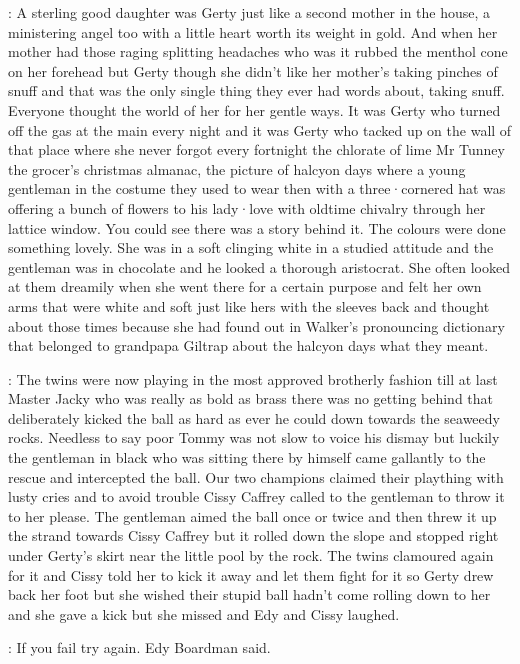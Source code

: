 :
A sterling good daughter
was Gerty
just like a second mother in the house,
a ministering angel too
with a little heart
worth its weight in gold.
And when her mother
had those raging splitting headaches
who was it rubbed the menthol cone on her forehead
but Gerty
though she didn't like her mother's taking pinches of snuff
and that was the only single thing
they ever had words about,
taking snuff.
Everyone thought the world of her
for her gentle ways.
It was Gerty
who turned off the gas at the main every night
and it was Gerty
who tacked up on the wall
of that place where she never forgot
every fortnight the chlorate of lime
Mr Tunney the grocer's christmas almanac,
the picture of halcyon days
where a young gentleman
in the costume they used to wear then
with a three·cornered hat
was offering a bunch of flowers
to his lady·love
with oldtime chivalry
through her lattice window.
You could see
there was a story behind it.
The colours were done something lovely.
She was in a soft clinging white
in a studied attitude
and the gentleman was in chocolate
and he looked a thorough aristocrat.
She often looked at them dreamily
when she went there
for a certain purpose
and felt her own arms
that were white and soft
just like hers
with the sleeves back
and thought about those times
because she had found out
in Walker's pronouncing dictionary
that belonged to grandpapa Giltrap
about the halcyon days
what they meant.

:
The twins were now playing
in the most approved brotherly fashion
till at last
Master Jacky
who was really as bold as brass
there was no getting behind that
deliberately kicked the ball
as hard as ever he could
down towards the seaweedy rocks.
Needless to say
poor Tommy was not slow to voice his dismay
but luckily the gentleman in black
who was sitting there by himself
came gallantly to the rescue
and intercepted the ball.
Our two champions
claimed their plaything
with lusty cries
and to avoid trouble
Cissy Caffrey called to the gentleman
to throw it to her please.
The gentleman aimed the ball
once or twice
and then threw it up the strand
towards Cissy Caffrey
but it rolled down the slope
and stopped right under Gerty's skirt
near the little pool by the rock.
The twins clamoured again for it
and Cissy told her to kick it away
and let them fight for it
so Gerty drew back her foot
but she wished
their stupid ball hadn't come rolling down to her
and she gave a kick
but she missed
and Edy and Cissy laughed.

\edy:
If you fail
try again.
Edy Boardman said.

